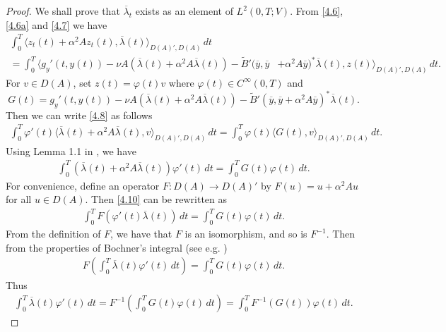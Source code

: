 \documentclass[reqno]{amsart}
\begin{document}
\begin{proof}
		We shall prove that $\overline{\lambda}_t$ exists as an element of $L^2(0,T;V)$. From \eqref{4.6}, \eqref{4.6a} and \eqref{4.7} we have
		\begin{equation}
			\begin{split}
				\int_0^T \langle z_t(t) + \alpha^2 Az_t(t),\overline{\lambda}(t)\rangle_{D(A)',D(A)}\,dt  \\
				= \int_0^T \langle g_y'(t,y(t)) - \nu A (\overline{\lambda}(t)+\alpha^2 A\overline{\lambda}(t)) - \widetilde{B}'(\overline{y},\overline{y} &+\alpha^2 A\overline{y})^*\overline{\lambda}(t),z(t) \rangle_{D(A)',D(A)}\,dt.\label{4.8}    
			\end{split}
		\end{equation}
		For $v \in D(A)$, set $z(t)=\varphi(t)v$ where $\varphi(t) \in C^{\infty}(0,T)$  and \[G(t)=g_y'(t,y(t)) - \nu A (\overline{\lambda}(t)+\alpha^2 A\overline{\lambda}(t)) - \widetilde{B}'(\overline{y},\overline{y} +\alpha^2 A\overline{y})^*\overline{\lambda}(t).\] Then we can write \eqref{4.8} as follows
		\begin{align} \label{4.9}
			\int_0^T \varphi'(t)\langle \overline{\lambda}(t) + \alpha^2 A\overline{\lambda}(t),v\rangle_{D(A)',D(A)}\,dt = \int_0^T \varphi(t)\langle G(t), v\rangle_{D(A)',D(A)} \,dt. 
		\end{align}
		Using Lemma 1.1 in \cite{temam1995navier}, we have
		\begin{align}\label{4.10}
			\int_0^T (\overline{\lambda}(t) + \alpha^2 A\overline{\lambda}(t))\varphi'(t) \,dt =\int_0^T G(t)\varphi(t) \,dt.
		\end{align}
		For convenience, define an operator $F:D(A) \to D(A)'$ by  $ F(u) = u + \alpha^2 Au$
		for all $u \in D(A)$. Then \eqref{4.10} can be rewritten as
		\begin{align*}
			\int_0^T F(\varphi'(t)\overline{\lambda}(t))\,dt = \int_0^T G(t)\varphi(t) \,dt. 
		\end{align*}
		From the definition of $F$, we have that $F$ is an isomorphism, and so is $F^{-1}$. Then from the properties of Bochner's integral (see e.g. \cite{yosida2012functional})
		\begin{align*}
			F\left(\int_0^T\overline{\lambda}(t)\varphi'(t)\,dt\right)  = \int_0^T G(t)\varphi(t) \,dt.
		\end{align*}
		Thus 
		\begin{align*}
			\int_0^T\overline{\lambda}(t)\varphi'(t)\,dt = F^{-1} \left(\int_0^T G(t)\varphi(t) \,dt\right) =\int_0^T F^{-1}(G(t))\varphi(t) \,dt.
		\end{align*}

\end{proof}
\end{document}
